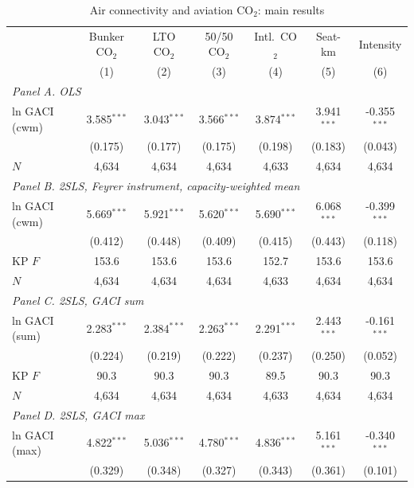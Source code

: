 \documentclass[12pt]{article}
\begin{document}
\begin{table}[htbp]
\centering
\begin{threeparttable}
\caption{Air connectivity and aviation CO$_2$: main results}
\label{tab:main}
\footnotesize
\begin{tabular}{lcccccc}
\toprule
 & \multicolumn{1}{c}{Bunker CO$_2$} & \multicolumn{1}{c}{LTO CO$_2$} & \multicolumn{1}{c}{50/50 CO$_2$} & \multicolumn{1}{c}{Intl.\ CO$_2$} & \multicolumn{1}{c}{Seat-km} & \multicolumn{1}{c}{Intensity} \\
 & (1) & (2) & (3) & (4) & (5) & (6) \\
\midrule
\multicolumn{7}{l}{\textit{Panel A. OLS}} \\
  ln GACI (cwm) & 3.585$^{***}$ & 3.043$^{***}$ & 3.566$^{***}$ & 3.874$^{***}$ & 3.941$^{***}$ & -0.355$^{***}$ \\
   & (0.175) & (0.177) & (0.175) & (0.198) & (0.183) & (0.043) \\
  $N$ & 4,634 & 4,634 & 4,634 & 4,633 & 4,634 & 4,634 \\
\midrule
\multicolumn{7}{l}{\textit{Panel B. 2SLS, Feyrer instrument, capacity-weighted mean}} \\
  ln GACI (cwm) & 5.669$^{***}$ & 5.921$^{***}$ & 5.620$^{***}$ & 5.690$^{***}$ & 6.068$^{***}$ & -0.399$^{***}$ \\
   & (0.412) & (0.448) & (0.409) & (0.415) & (0.443) & (0.118) \\
  KP $F$ & 153.6 & 153.6 & 153.6 & 152.7 & 153.6 & 153.6 \\
  $N$ & 4,634 & 4,634 & 4,634 & 4,633 & 4,634 & 4,634 \\
\midrule
\multicolumn{7}{l}{\textit{Panel C. 2SLS, GACI sum}} \\
  ln GACI (sum) & 2.283$^{***}$ & 2.384$^{***}$ & 2.263$^{***}$ & 2.291$^{***}$ & 2.443$^{***}$ & -0.161$^{***}$ \\
   & (0.224) & (0.219) & (0.222) & (0.237) & (0.250) & (0.052) \\
  KP $F$ & 90.3 & 90.3 & 90.3 & 89.5 & 90.3 & 90.3 \\
  $N$ & 4,634 & 4,634 & 4,634 & 4,633 & 4,634 & 4,634 \\
\midrule
\multicolumn{7}{l}{\textit{Panel D. 2SLS, GACI max}} \\
  ln GACI (max) & 4.822$^{***}$ & 5.036$^{***}$ & 4.780$^{***}$ & 4.836$^{***}$ & 5.161$^{***}$ & -0.340$^{***}$ \\
   & (0.329) & (0.348) & (0.327) & (0.343) & (0.361) & (0.101) \\

\end{tabular}
\end{threeparttable}
\end{table}
\end{document}
